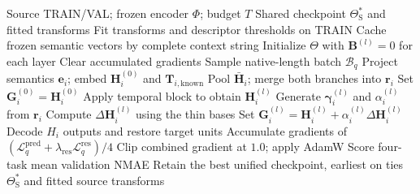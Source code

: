 \documentclass[journal]{IEEEtran}
\begin{document}
\begin{algorithm}[!t]
\caption{Joint-state residual control and source training}
\label{alg:joint-window-control}
\small
\begin{algorithmic}[1]
\Require Source TRAIN/VAL; frozen encoder $\Phi$; budget $T$
\Ensure Shared checkpoint $\Theta_{\mathrm S}^*$ and fitted transforms
\State Fit transforms and descriptor thresholds on TRAIN
\State Cache frozen semantic vectors by complete context string
\State Initialize $\Theta$ with $\mathbf B^{(l)}=0$ for each layer
  \State Clear accumulated gradients
    \State Sample native-length batch $\mathcal B_q$
    \State Project semantics $\mathbf e_i$; embed $\mathbf H_i^{(0)}$ and $\mathbf T_{i,\mathrm{known}}$
    \State Pool $\bar{\mathbf H}_i$; merge both branches into $\mathbf r_i$
    \State Set $\mathbf G_i^{(0)}=\mathbf H_i^{(0)}$
      \State Apply temporal block to obtain $\mathbf H_i^{(l)}$
      \State Generate $\boldsymbol\gamma_i^{(l)}$ and $\alpha_i^{(l)}$ from $\mathbf r_i$
      \State Compute $\Delta\mathbf H_i^{(l)}$ using the thin bases
      \State Set $\mathbf G_i^{(l)}=\mathbf H_i^{(l)}+\alpha_i^{(l)}\Delta\mathbf H_i^{(l)}$
    \EndFor
    \State Decode $H_i$ outputs and restore target units
    \State Accumulate gradients of $(\mathcal L_q^{\mathrm{pred}}+\lambda_{\mathrm{res}}\mathcal L_q^{\mathrm{res}})/4$
  \EndFor
  \State Clip combined gradient at $1.0$; apply AdamW
    \State Score four-task mean validation NMAE
    \State Retain the best unified checkpoint, earliest on ties
  \EndIf
\EndFor
\State \Return $\Theta_{\mathrm S}^*$ and fitted source transforms
\end{algorithmic}
\end{algorithm}
\end{document}
